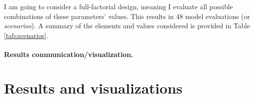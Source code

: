 I am going to consider a full-factorial design, meaning I evaluate all possible combinations of these parameters' values. This results in 48 model evaluations (or \textit{scenarios}). A summary of the elements and values considered is provided in Table \ref{tab:scenarios}.


\begin{table}
    \centering
    \caption{Inputs and values considered for the sensitivity analysis.}
    \label{tab:scenarios}
\end{table}




\paragraph{Results communication/visualization.}




\section{Results and visualizations} \label{sec:ch4_res}